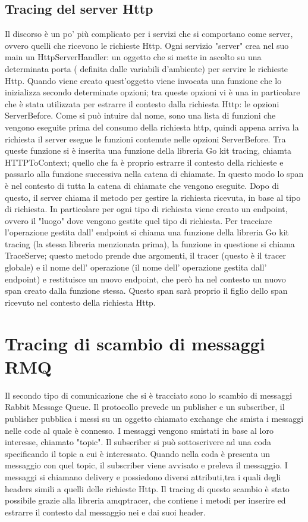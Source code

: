 \documentclass[a4paper,12pt,titlepage,italian,openany]{report}
\begin{document}
\subsection{Tracing del server Http}
Il discorso è un po' più complicato per i servizi che si comportano come server, ovvero quelli che ricevono le richieste Http. Ogni servizio "server" crea nel suo main un HttpServerHandler: un oggetto che si mette in ascolto su una determinata porta ( definita dalle variabili d'ambiente) per servire le richieste Http. Quando viene creato quest'oggetto viene invocata una funzione che lo inizializza secondo determinate opzioni; tra queste opzioni 
vi è una in particolare che è stata utilizzata per estrarre il contesto dalla richiesta Http: le opzioni ServerBefore. Come si può intuire dal nome, sono una lista di funzioni che vengono eseguite prima del consumo della richiesta http, quindi appena arriva la richiesta il server esegue le funzioni contenute nelle opzioni ServerBefore. Tra queste funzione si è inserita una funzione della libreria Go kit tracing, chiamta HTTPToContext; quello che fa è proprio estrarre il contesto della richieste e passarlo alla funzione successiva nella catena di chiamate. In questo modo  lo span è nel contesto di tutta la catena di chiamate che vengono eseguite.
Dopo di questo, il server chiama il metodo per gestire la richiesta ricevuta, in base al tipo di richiesta. In particolare per ogni tipo di richiesta viene creato un endpoint, ovvero il "luogo" dove vengono gestite quel tipo di richiesta. Per tracciare l'operazione gestita dall' endpoint si chiama una funzione della libreria Go kit tracing (la stessa libreria menzionata prima), la funzione in questione si chiama TraceServe; questo metodo prende due argomenti, il tracer (questo è il tracer globale) e il nome dell' operazione (il nome dell' operazione gestita dall' endpoint) e restituisce un nuovo endpoint, che però ha nel contesto un nuovo span creato dalla funzione stessa. Questo span sarà proprio il figlio dello span ricevuto nel contesto della richiesta Http. 

\section{Tracing di scambio di messaggi RMQ}
Il secondo tipo di comunicazione che si è tracciato sono lo scambio di messaggi Rabbit Message Queue. Il protocollo prevede un publisher e un subscriber, il publisher pubblica i messi su un oggetto chiamato exchange che smista i messaggi nelle code al quale è connesso. I messaggi vengono smistati in base al loro interesse, chiamato "topic". Il subscriber si può sottoscrivere ad una coda specificando il topic a cui è interessato. Quando nella coda è presenta un messaggio con quel topic, il subscriber viene avvisato e preleva il messaggio. I messaggi si chiamano delivery e possiedono diversi attributi,tra i quali degli headers simili a quelli delle richieste Http.
Il tracing di questo scambio è stato possibile grazie alla libreria amqptracer, che contiene i metodi per inserire ed estrarre il contesto dal messaggio nei e dai suoi header.
\end{document}
